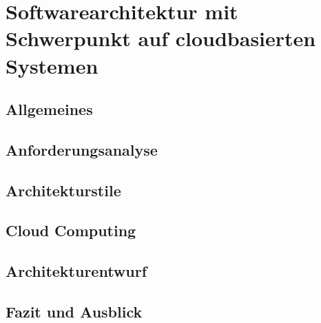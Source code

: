 \chapter{Softwarearchitektur mit Schwerpunkt auf cloudbasierten Systemen}

    \section{Allgemeines} \label{Allgemeines}
    

    \clearpage

    \section{Anforderungsanalyse} \label{Anforderungsanalyse}
    

    \clearpage

    \section{Architekturstile} \label{Architekturstile}
    

    \clearpage

    \section{Cloud Computing} \label{Cloud Computing}
    

    \clearpage
    
    \section{Architekturentwurf} \label{Architekturentwurf}
    

    \clearpage

    \section{Fazit und Ausblick} \label{Fazit und Ausblick}
    
